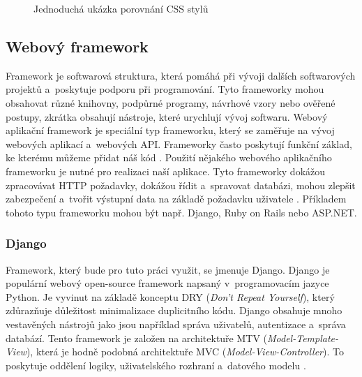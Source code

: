 \begin{figure}[h]
\centering
{}\hfill
{}
\caption{Jednoduchá ukázka porovnání CSS stylů}
\label{fig:subfigures}
\end{figure}


\subsection{Webový framework}
\label{sec:webframework}

Framework je softwarová struktura, která pomáhá při vývoji dalších softwarových projektů a~poskytuje podporu při programování. Tyto frameworky mohou obsahovat různé knihovny, podpůrné programy, návrhové vzory nebo ověřené postupy, zkrátka obsahují nástroje, které urychlují vývoj softwaru. Webový aplikační framework je speciální typ frameworku, který se zaměřuje na vývoj webových aplikací a~webových API. Frameworky často poskytují funkční základ, ke kterému můžeme přidat náš kód \cite{what-is-web-framework-geeks}. Použití nějakého webového aplikačního frameworku je nutné pro realizaci naší aplikace. Tyto frameworky dokážou zpracovávat HTTP požadavky, dokážou řídit a~spravovat databázi, mohou zlepšit zabezpečení a~tvořit výstupní data na základě požadavku uživatele \cite{what-is-web-framework-medium}. Příkladem tohoto typu frameworku mohou být např. Django, Ruby on Rails nebo ASP.NET.

\subsubsection*{Django}

Framework, který bude pro tuto práci využit, se jmenuje Django. Django je populární webový open-source framework napsaný v~programovacím jazyce Python. Je vyvinut na základě konceptu DRY (\emph{Don't Repeat Yourself}), který zdůrazňuje důležitost minimalizace duplicitního kódu. Django obsahuje mnoho vestavěných nástrojů jako jsou například správa uživatelů, autentizace a~správa databází. Tento framework je založen na architektuře MTV (\emph{Model-Template-View}), která je hodně podobná architektuře MVC (\emph{Model-View-Controller}). To poskytuje oddělení logiky, uživatelského rozhraní a~datového modelu \cite{django-dry,django-online-dokumentace}. 

